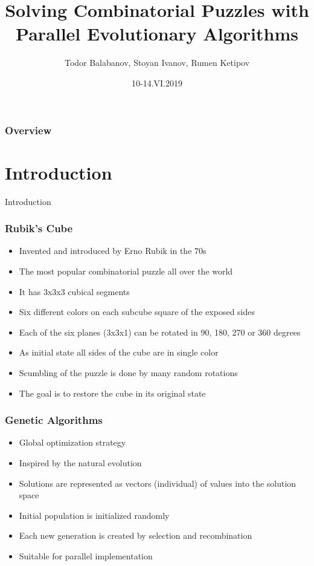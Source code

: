 \documentclass{beamer}
\title[12th International Conference on Large-Scale Scientific Computations, June 10 - 14, 2019, Sozopol, Bulgaria]{
	Solving Combinatorial Puzzles with Parallel Evolutionary Algorithms
}
\author{Todor Balabanov, Stoyan Ivanov, Rumen Ketipov}
\date{10-14.VI.2019}
\institute[IICT-BAS, LSSC'19] {
	Institute of Information and Communication Technologies \\ 
	Bulgarian Academy of Sciences \\
	\medskip
	\textit{todorb@iinf.bas.bg}
}
\begin{document}
\begin{frame}
\titlepage
\end{frame}

\begin{frame}
\frametitle{Overview}
\tableofcontents
\end{frame}

\section{Introduction}

\begin{frame}
\center \huge{Introduction}
\end{frame}

\begin{frame}
\frametitle{Rubik's Cube}
\begin{itemize}
  \item Invented and introduced by Erno Rubik in the 70s
  \item The most popular combinatorial puzzle all over the world
  \item It has 3x3x3 cubical segments
  \item Six different colors on each subcube square of the exposed sides
  \item Each of the six planes (3x3x1) can be rotated in 90, 180, 270 or 360 degrees
  \item As initial state all sides of the cube are in single color
  \item Scumbling of the puzzle is done by many random rotations
  \item The goal is to restore the cube in its original state
\end{itemize}
\end{frame}

\begin{frame}
\frametitle{Genetic Algorithms}
\begin{itemize}
  \item Global optimization strategy
  \item Inspired by the natural evolution
  \item Solutions are represented as vectors (individual) of values into the solution space
  \item Initial population is initialized randomly
  \item Each new generation is created by selection and recombination
  \item Suitable for parallel implementation
\end{itemize}
\end{frame}
\end{document}

